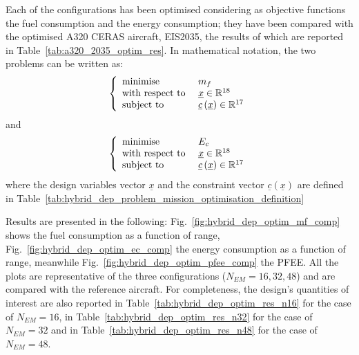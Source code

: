Each of the configurations has been optimised considering as objective functions the fuel consumption and the energy consumption; they have been compared with the optimised A320 CERAS aircraft, EIS2035, the results of which are reported in Table~\ref{tab:a320_2035_optim_res}. 
In mathematical notation, the two problems can be written as:
\begin{equation*}
\left\{\begin{array}{l l}
	\textrm{minimise } & m_f \\
	\textrm{with respect to } & \underline{x}\in\mathbb{R}^{18} \\
	\textrm{subject to } & \underline{c}\left(\underline{x}\right)\in\mathbb{R}^{17} \\						 
\end{array}\right.
\end{equation*}
and 
\begin{equation*}
\left\{\begin{array}{l l}
	\textrm{minimise } & E_c \\
	\textrm{with respect to } & \underline{x}\in\mathbb{R}^{18} \\
	\textrm{subject to } & \underline{c}\left(\underline{x}\right)\in\mathbb{R}^{17} \\						 
\end{array}\right.
\end{equation*}
where the design variables vector $\underline{x}$ and the constraint vector $\underline{c}\left(\underline{x}\right)$ are defined in Table~\ref{tab:hybrid_dep_problem_mission_optimisation_definition}

Results are presented in the following: Fig.~\ref{fig:hybrid_dep_optim_mf_comp} shows the fuel consumption as a function of range, Fig.~\ref{fig:hybrid_dep_optim_ec_comp} the energy consumption as a function of range, meanwhile Fig.~\ref{fig:hybrid_dep_optim_pfee_comp} the PFEE. 
All the plots are representative of the three configurations ($N_{EM}=16,32,48$) and are compared with the reference aircraft. 
For completeness, the design's quantities of interest are also reported in Table~\ref{tab:hybrid_dep_optim_res_n16} for the case of $N_{EM}=16$, in Table~\ref{tab:hybrid_dep_optim_res_n32} for the case of $N_{EM}=32$ and in Table~\ref{tab:hybrid_dep_optim_res_n48} for the case of $N_{EM}=48$. 

